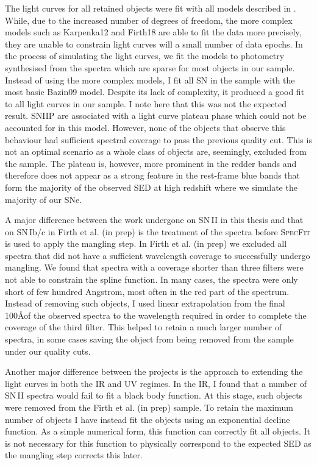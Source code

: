 The light curves for all retained objects were fit with all models described in . While, due to the increased number of degrees of freedom, the more complex models such as Karpenka12 and Firth18 are able to fit the data more precisely, they are unable to constrain light curves will a small number of data epochs. In the process of simulating the light curves, we fit the models to photometry synthesised from the spectra which are sparse for most objects in our sample. Instead of using the more complex models, I fit all SN in the sample with the most basic Bazin09 model. Despite its lack of complexity, it produced a good fit to all light curves in our sample. I note here that this was not the expected result. SNIIP are associated with a light curve plateau phase which could not be accounted for in this model. However, none of the objects that observe this behaviour had sufficient spectral coverage to pass the previous quality cut. This is not an optimal scenario as a whole class of objects are, seemingly, excluded from the sample. The plateau is, however, more prominent in the redder bands and therefore does not appear as a strong feature in the rest-frame blue bands that form the majority of the observed SED at high redshift where we simulate the majority of our SNe.

A major difference between the work undergone on SN\,II in this thesis and that on SN\,Ib/c in Firth et al. (in prep) is the treatment of the spectra before \textsc{SpecFit} is used to apply the mangling step. In Firth et al. (in prep) we excluded all spectra that did not have a sufficient wavelength coverage to successfully undergo mangling. We found that spectra with a coverage shorter than three filters were not able to constrain the spline function. In many cases, the spectra were only short of few hundred Angstrom, most often in the red part of the spectrum. Instead of removing such objects, I used linear extrapolation from the final 100\AA of the observed spectra to the wavelength required in order to complete the coverage of the third filter. This helped to retain a much larger number of spectra, in some cases saving the object from being removed from the sample under our quality cuts.

Another major difference between the projects is the approach to extending the light curves in both the IR and UV regimes. In the IR, I found that a number of SN\,II spectra would fail to fit a black body function. At this stage, such objects were removed from the Firth et al. (in prep) sample. To retain the maximum number of objects I have instead fit the objects using an exponential decline function. As a simple numerical form, this function can correctly fit all objects. It is not necessary for this function to physically correspond to the expected SED as the mangling step corrects this later.

